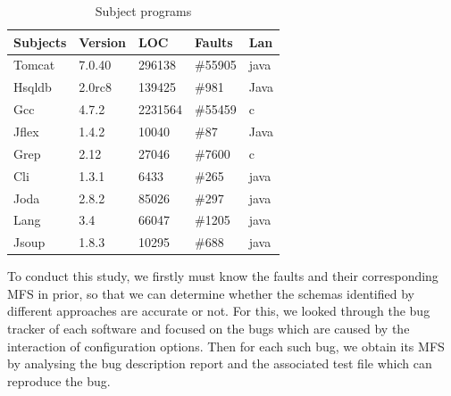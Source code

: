 \documentclass{sig-alternate-05-2015}
\begin{document}
{{{{\begin{table}[ht]
\caption{Subject programs}
\label{subject}
\centering
\begin{tabular}{l|l|l|l|l}
\hline
Subjects & Version & LOC & Faults &  Lan \\
\hline
Tomcat   &   7.0.40      & 296138    &   \#55905  & java  \\
Hsqldb   &   2.0rc8  &   139425   &    \#981  & Java \\
Gcc      &   4.7.2      &  2231564   & \#55459   &  c\\
Jflex    &    1.4.2     & 10040    &    \#87   & Java \\
Grep     &   2.12       & 27046   &    \#7600  & c \\
Cli      &   1.3.1      & 6433    &    \#265   & java  \\
Joda     &   2.8.2      & 85026   &    \#297   & java \\
Lang     &   3.4        & 66047  &     \#1205  & java \\
Jsoup    &    1.8.3     & 10295   &    \#688   & java \\

 \hline
\end{tabular}

\end{table}

To conduct this study, we firstly must know the faults and their corresponding MFS in prior, so that we can determine whether the schemas identified by different approaches are accurate or not. For this, we looked through the bug tracker of each software and focused on the bugs which are caused by the interaction of configuration options. Then for each such bug, we obtain its MFS by analysing the bug description report and the associated test file which can reproduce the bug.







}}}}
\end{document}

